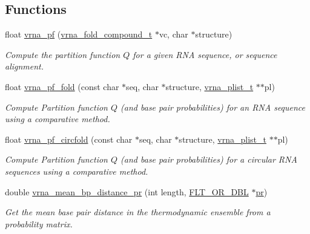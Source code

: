 \subsection*{Functions}
\begin{DoxyCompactItemize}
\item 
float \hyperlink{group__pf__fold_ga29e256d688ad221b78d37f427e0e99bc}{vrna\-\_\-pf} (\hyperlink{group__fold__compound_ga1b0cef17fd40466cef5968eaeeff6166}{vrna\-\_\-fold\-\_\-compound\-\_\-t} $\ast$vc, char $\ast$structure)
\begin{DoxyCompactList}\small\item\em Compute the partition function $Q$ for a given R\-N\-A sequence, or sequence alignment. \end{DoxyCompactList}\item 
float \hyperlink{group__pf__fold_ga59935ba485ac90f0efb5a38e2962d879}{vrna\-\_\-pf\-\_\-fold} (const char $\ast$seq, char $\ast$structure, \hyperlink{group__data__structures_ga8e4eb5e1bfc95776559575beb359af87}{vrna\-\_\-plist\-\_\-t} $\ast$$\ast$pl)
\begin{DoxyCompactList}\small\item\em Compute Partition function $Q$ (and base pair probabilities) for an R\-N\-A sequence using a comparative method. \end{DoxyCompactList}\item 
float \hyperlink{group__pf__fold_ga6dc133fce577fc0370986f3a3301cd10}{vrna\-\_\-pf\-\_\-circfold} (const char $\ast$seq, char $\ast$structure, \hyperlink{group__data__structures_ga8e4eb5e1bfc95776559575beb359af87}{vrna\-\_\-plist\-\_\-t} $\ast$$\ast$pl)
\begin{DoxyCompactList}\small\item\em Compute Partition function $Q$ (and base pair probabilities) for a circular R\-N\-A sequences using a comparative method. \end{DoxyCompactList}\item 
double \hyperlink{group__pf__fold_gad3f0c240512e6d43e2e4d4c2076021f5}{vrna\-\_\-mean\-\_\-bp\-\_\-distance\-\_\-pr} (int length, \hyperlink{group__data__structures_ga31125aeace516926bf7f251f759b6126}{F\-L\-T\-\_\-\-O\-R\-\_\-\-D\-B\-L} $\ast$\hyperlink{fold__vars_8h_ac98ec419070aee6831b44e5c700f090f}{pr})
\begin{DoxyCompactList}\small\item\em Get the mean base pair distance in the thermodynamic ensemble from a probability matrix. \end{DoxyCompactList}\item 

\end{DoxyCompactItemize}
